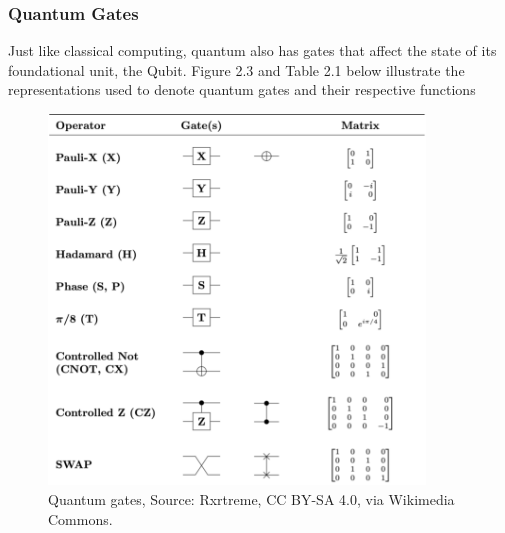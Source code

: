 \subsubsection*{Quantum Gates}

Just like classical computing, quantum also has gates that affect the state of its foundational unit, the Qubit. Figure 2.3 and Table 2.1 below illustrate the representations used to denote quantum gates and their respective functions 


\begin{figure}[ht]
\centering
\includegraphics[width=10cm]{images/Quantum_Logic_Gates.png}
\caption{Quantum gates, Source: Rxrtreme, CC BY-SA 4.0, via Wikimedia Commons.}
\end{figure}


